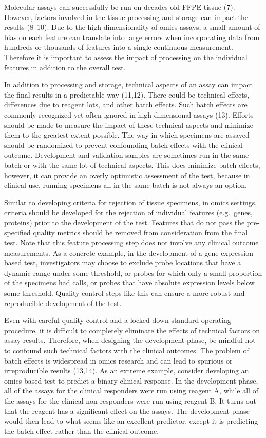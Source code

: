\documentclass[11pt]{article}
\begin{document}
Molecular assays can successfully be run on decades old FFPE tissue (7).
However, factors involved in the tissue processing and storage can
impact the results (8--10). Due to the high dimensionality of omics
assays, a small amount of bias on each feature can translate into large
errors when incorporating data from hundreds or thousands of features
into a single continuous measurement. Therefore it is important to
assess the impact of processing on the individual features in addition
to the overall test.

In addition to processing and storage, technical aspects of an assay can
impact the final results in a predictable way (11,12). There could be
technical effects, differences due to reagent lots, and other batch
effects. Such batch effects are commonly recognized yet often ignored in
high-dimensional assays (13). Efforts should be made to measure the
impact of these technical aspects and minimize them to the greatest
extent possible. The way in which specimens are assayed should be
randomized to prevent confounding batch effects with the clinical
outcome. Development and validation samples are sometimes run in the
same batch or with the same lot of technical aspects. This does minimize
batch effects, however, it can provide an overly optimistic assessment
of the test, because in clinical use, running specimens all in the same
batch is not always an option.

Similar to developing criteria for rejection of tissue specimens, in
omics settings, criteria should be developed for the rejection of
individual features (e.g.~genes, proteins) prior to the development of
the test. Features that do not pass the pre-specified quality metrics
should be removed from consideration from the final test. Note that this
feature processing step does not involve any clinical outcome
measurements. As a concrete example, in the development of a gene
expression based test, investigators may choose to exclude probe
locations that have a dynamic range under some threshold, or probes for
which only a small proportion of the specimens had calls, or probes that
have absolute expression levels below some threshold. Quality control
steps like this can ensure a more robust and reproducible development of
the test.

Even with careful quality control and a locked down standard operating
procedure, it is difficult to completely eliminate the effects of
technical factors on assay results. Therefore, when designing the
development phase, be mindful not to confound such technical factors
with the clinical outcomes. The problem of batch effects is widespread
in omics research and can lead to spurious or irreproducible results
(13,14). As an extreme example, consider developing an omics-based test
to predict a binary clinical response. In the development phase, all of
the assays for the clinical responders were run using reagent A, while
all of the assays for the clinical non-responders were run using reagent
B. It turns out that the reagent has a significant effect on the assays.
The development phase would then lead to what seems like an excellent
predictor, except it is predicting the batch effect rather than the
clinical outcome.
\end{document}
